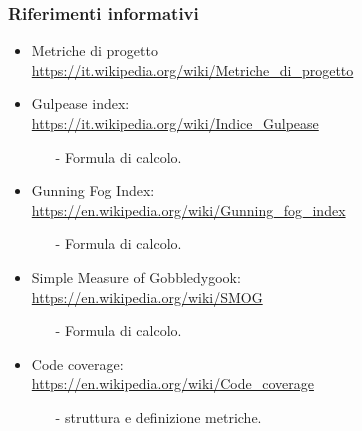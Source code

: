 \subsubsection{Riferimenti informativi}
 \begin{itemize}
	\item Metriche di progetto \\
 		\url{https://it.wikipedia.org/wiki/Metriche_di_progetto}
 	\item Gulpease index: \\
 		\url{https://it.wikipedia.org/wiki/Indice_Gulpease}
 	\begin{itemize}
 		\item[-] Formula di calcolo.
	\end{itemize}
	\item Gunning Fog Index: \\
		\url{https://en.wikipedia.org/wiki/Gunning_fog_index}
		\begin{itemize}
		\item[-] Formula di calcolo.
		\end{itemize}
	\item Simple Measure of Gobbledygook: \\ 
		 \url{https://en.wikipedia.org/wiki/SMOG}
		 \begin{itemize}
		 	\item[-] Formula di calcolo.
		 \end{itemize}
	\item Code coverage: \\ 
		\url{https://en.wikipedia.org/wiki/Code_coverage}
		\begin{itemize}
		\item[-] struttura e definizione metriche.
		\end{itemize}
\end{itemize}
